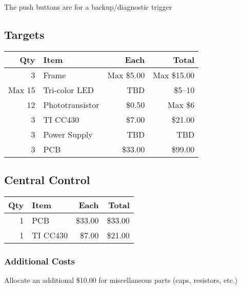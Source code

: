 \documentclass{article}
\begin{document}
The push buttons are for a backup/diagnostic trigger

\subsection{Targets}

\begin{tabular}{|r|l|r|r|}
\hline
\textbf{Qty} & \textbf{Item} & \textbf{Each} & \textbf{Total} \\
\hline
3 & Frame & Max \$5.00 & Max \$15.00 \\
\hline
Max 15 & Tri-color LED & TBD & \$5--10 \\
\hline
12 & Phototransistor & \$0.50 & Max \$6 \\
\hline
3 & TI CC430 & \$7.00 & \$21.00 \\
\hline
3 & Power Supply & TBD & TBD \\
\hline
3 & PCB & \$33.00 & \$99.00 \\
\hline
\end{tabular}

\subsection{Central Control}

\begin{tabular}{|r|l|r|r|}
\hline
\textbf{Qty} & \textbf{Item} & \textbf{Each} & \textbf{Total} \\
\hline
1 & PCB & \$33.00 & \$33.00 \\
\hline
1 & TI CC430 & \$7.00 & \$21.00 \\
\hline
\end{tabular}

\subsubsection{Additional Costs}

Allocate an additional \$10.00 for miscellaneous parts (caps, resistors, etc.)
\end{document}
